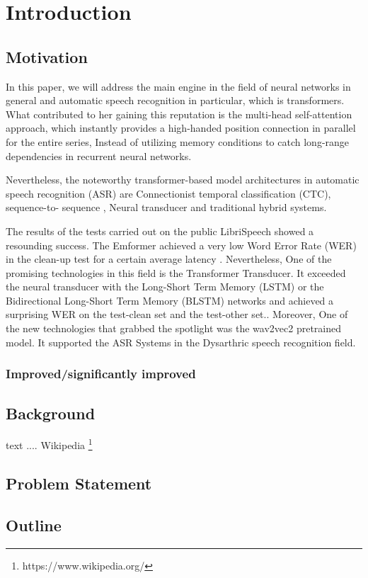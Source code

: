 \chapter{Introduction}
\label{cha:introduction}
\section{Motivation}

In this paper, we will address the main engine in the field of neural networks\cite{dai2019transformer,devlin2018bert,raffel2020exploring} in general and automatic speech recognition in particular, which is transformers\cite{vaswani2017attention}. What contributed to her gaining this reputation is the multi-head self-attention approach, which instantly provides a high-handed position connection in parallel for the entire series, Instead of utilizing memory conditions to catch long-range dependencies in recurrent neural networks.

Nevertheless, the noteworthy transformer-based model architectures in automatic speech recognition (ASR) are Connectionist temporal classification (CTC)\cite{salazar2019self,zhang2020faster},
sequence-to- sequence \cite{dong2018speech,karita2019comparative,sperber2018self,zhou2018syllable,wang2020low}, Neural transducer \cite{zhang2020transformer,yeh2019transformer,gulati2020conformer} and traditional hybrid systems\cite{wang2020transformer,povey2018time}.


The results of the tests carried out on the public LibriSpeech showed a resounding success. The Emformer achieved a very low Word Error Rate (WER) in the clean-up test for a certain average latency \cite{shi2021emformer}. Nevertheless, One of the promising technologies in this field is the Transformer Transducer. It exceeded the neural transducer with the Long-Short Term Memory (LSTM) or the Bidirectional Long-Short Term Memory (BLSTM) networks and achieved a surprising WER on the test-clean set and the test-other set.\cite{yeh2019transformer}. Moreover, One of the new technologies that grabbed the spotlight was the wav2vec2 pretrained model. It supported the ASR Systems in the Dysarthric speech recognition field\cite{karthick2022speaker}. 


\subsection{Improved/significantly improved}
\section{Background}
text .... Wikipedia \footnote{https://www.wikipedia.org/}




\section{Problem Statement}

 

\section{Outline}

